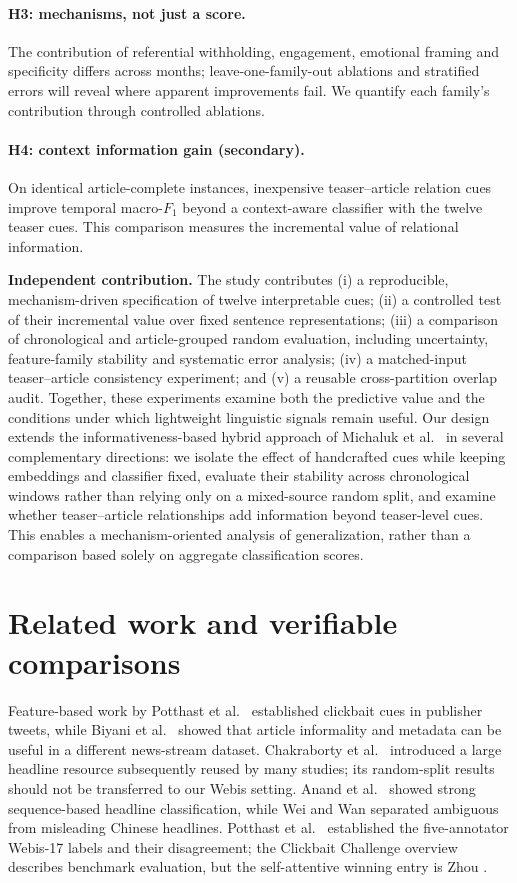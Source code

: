 \documentclass[11pt]{article}
\begin{document}
\paragraph{H3: mechanisms, not just a score.} The contribution of referential withholding, engagement, emotional framing and specificity differs across months; leave-one-family-out ablations and stratified errors will reveal where apparent improvements fail. We quantify each family's contribution through controlled ablations.

\paragraph{H4: context information gain (secondary).} On identical article-complete instances, inexpensive teaser--article relation cues improve temporal macro-$F_1$ beyond a context-aware classifier with the twelve teaser cues. This comparison measures the incremental value of relational information.

\textbf{Independent contribution.} The study contributes (i) a reproducible, mechanism-driven specification of twelve interpretable cues; (ii) a controlled test of their incremental value over fixed sentence representations; (iii) a comparison of chronological and article-grouped random evaluation, including uncertainty, feature-family stability and systematic error analysis; (iv) a matched-input teaser--article consistency experiment; and (v) a reusable cross-partition overlap audit. Together, these experiments examine both the predictive value and the conditions under which lightweight linguistic signals remain useful. Our design extends the informativeness-based hybrid approach of Michaluk et al.\ \cite{michaluk2026} in several complementary directions: we isolate the effect of handcrafted cues while keeping embeddings and classifier fixed, evaluate their stability across chronological windows rather than relying only on a mixed-source random split, and examine whether teaser--article relationships add information beyond teaser-level cues. This enables a mechanism-oriented analysis of generalization, rather than a comparison based solely on aggregate classification scores.

\section{Related work and verifiable comparisons}
Feature-based work by Potthast et al.\ \cite{potthast2016} established clickbait cues in publisher tweets, while Biyani et al.\ \cite{biyani2016} showed that article informality and metadata can be useful in a different news-stream dataset. Chakraborty et al.\ \cite{chakraborty2016} introduced a large headline resource subsequently reused by many studies; its random-split results should not be transferred to our Webis setting. Anand et al.\ \cite{anand2017} showed strong sequence-based headline classification, while Wei and Wan \cite{wei2017} separated ambiguous from misleading Chinese headlines. Potthast et al.\ \cite{potthast2018} established the five-annotator Webis-17 labels and their disagreement; the Clickbait Challenge overview \cite{potthast2018challenge} describes benchmark evaluation, but the self-attentive winning entry is Zhou \cite{zhou2017}.
\end{document}

